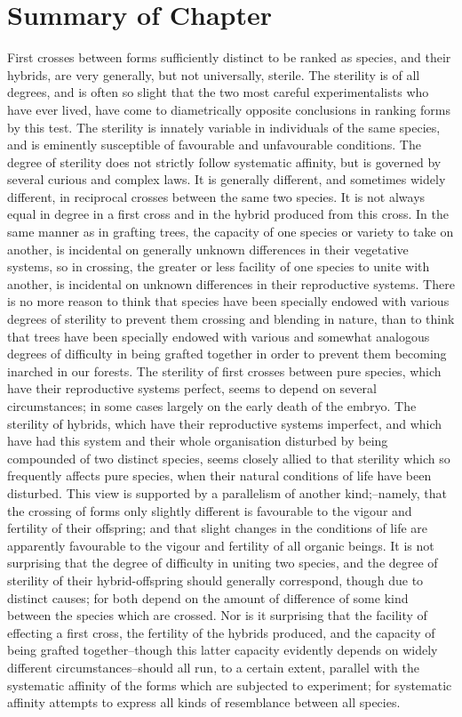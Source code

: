 \chapter{Summary of Chapter}
First crosses between forms sufficiently distinct to be ranked as species, and their hybrids, are very generally, but not universally, sterile. The sterility is of all degrees, and is often so slight that the two most careful experimentalists who have ever lived, have come to diametrically opposite conclusions in ranking forms by this test. The sterility is innately variable in individuals of the same species, and is eminently susceptible of favourable and unfavourable conditions. The degree of sterility does not strictly follow systematic affinity, but is governed by several curious and complex laws. It is generally different, and sometimes widely different, in reciprocal crosses between the same two species. It is not always equal in degree in a first cross and in the hybrid produced from this cross.
In the same manner as in grafting trees, the capacity of one species or variety to take on another, is incidental on generally unknown differences in their vegetative systems, so in crossing, the greater or less facility of one species to unite with another, is incidental on unknown differences in their reproductive systems. There is no more reason to think that species have been specially endowed with various degrees of sterility to prevent them crossing and blending in nature, than to think that trees have been specially endowed with various and somewhat analogous degrees of difficulty in being grafted together in order to prevent them becoming inarched in our forests.
The sterility of first crosses between pure species, which have their reproductive systems perfect, seems to depend on several circumstances; in some cases largely on the early death of the embryo. The sterility of hybrids, which have their reproductive systems imperfect, and which have had this system and their whole organisation disturbed by being compounded of two distinct species, seems closely allied to that sterility which so frequently affects pure species, when their natural conditions of life have been disturbed. This view is supported by a parallelism of another kind;--namely, that the crossing of forms only slightly different is favourable to the vigour and fertility of their offspring; and that slight changes in the conditions of life are apparently favourable to the vigour and fertility of all organic beings. It is not surprising that the degree of difficulty in uniting two species, and the degree of sterility of their hybrid-offspring should generally correspond, though due to distinct causes; for both depend on the amount of difference of some kind between the species which are crossed. Nor is it surprising that the facility of effecting a first cross, the fertility of the hybrids produced, and the capacity of being grafted together--though this latter capacity evidently depends on widely different circumstances--should all run, to a certain extent, parallel with the systematic affinity of the forms which are subjected to experiment; for systematic affinity attempts to express all kinds of resemblance between all species.
